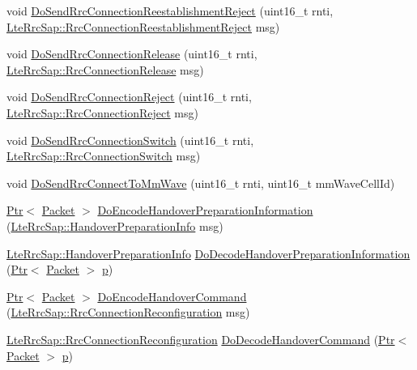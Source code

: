 \begin{DoxyCompactItemize}
\item 
void \hyperlink{classns3_1_1MmWaveEnbRrcProtocolIdeal_a5852803f45a6200cd609c0f5bae6fb29}{Do\+Send\+Rrc\+Connection\+Reestablishment\+Reject} (uint16\+\_\+t rnti, \hyperlink{structns3_1_1LteRrcSap_1_1RrcConnectionReestablishmentReject}{Lte\+Rrc\+Sap\+::\+Rrc\+Connection\+Reestablishment\+Reject} msg)
\item 
void \hyperlink{classns3_1_1MmWaveEnbRrcProtocolIdeal_a3a056c79c8f1e0b1ac5d64c544070df6}{Do\+Send\+Rrc\+Connection\+Release} (uint16\+\_\+t rnti, \hyperlink{structns3_1_1LteRrcSap_1_1RrcConnectionRelease}{Lte\+Rrc\+Sap\+::\+Rrc\+Connection\+Release} msg)
\item 
void \hyperlink{classns3_1_1MmWaveEnbRrcProtocolIdeal_aa56a53ba64c33ac87b57dabe8c31142f}{Do\+Send\+Rrc\+Connection\+Reject} (uint16\+\_\+t rnti, \hyperlink{structns3_1_1LteRrcSap_1_1RrcConnectionReject}{Lte\+Rrc\+Sap\+::\+Rrc\+Connection\+Reject} msg)
\item 
void \hyperlink{classns3_1_1MmWaveEnbRrcProtocolIdeal_a607eb31066bea3c99c0a8c201c2dc579}{Do\+Send\+Rrc\+Connection\+Switch} (uint16\+\_\+t rnti, \hyperlink{structns3_1_1LteRrcSap_1_1RrcConnectionSwitch}{Lte\+Rrc\+Sap\+::\+Rrc\+Connection\+Switch} msg)
\item 
void \hyperlink{classns3_1_1MmWaveEnbRrcProtocolIdeal_a2f404e7bc728fe77276e437e1f665759}{Do\+Send\+Rrc\+Connect\+To\+Mm\+Wave} (uint16\+\_\+t rnti, uint16\+\_\+t mm\+Wave\+Cell\+Id)
\item 
\hyperlink{classns3_1_1Ptr}{Ptr}$<$ \hyperlink{classns3_1_1Packet}{Packet} $>$ \hyperlink{classns3_1_1MmWaveEnbRrcProtocolIdeal_a0c1f97ed231f7e366eeccce429bf6ecb}{Do\+Encode\+Handover\+Preparation\+Information} (\hyperlink{structns3_1_1LteRrcSap_1_1HandoverPreparationInfo}{Lte\+Rrc\+Sap\+::\+Handover\+Preparation\+Info} msg)
\item 
\hyperlink{structns3_1_1LteRrcSap_1_1HandoverPreparationInfo}{Lte\+Rrc\+Sap\+::\+Handover\+Preparation\+Info} \hyperlink{classns3_1_1MmWaveEnbRrcProtocolIdeal_aebd78312da19b0fadf52e300020a1d81}{Do\+Decode\+Handover\+Preparation\+Information} (\hyperlink{classns3_1_1Ptr}{Ptr}$<$ \hyperlink{classns3_1_1Packet}{Packet} $>$ \hyperlink{lte__link__budget__x2__handover__measures_8m_ac9de518908a968428863f829398a4e62}{p})
\item 
\hyperlink{classns3_1_1Ptr}{Ptr}$<$ \hyperlink{classns3_1_1Packet}{Packet} $>$ \hyperlink{classns3_1_1MmWaveEnbRrcProtocolIdeal_a3fb294c2426f91653b1b9161ec4d73fc}{Do\+Encode\+Handover\+Command} (\hyperlink{structns3_1_1LteRrcSap_1_1RrcConnectionReconfiguration}{Lte\+Rrc\+Sap\+::\+Rrc\+Connection\+Reconfiguration} msg)
\item 
\hyperlink{structns3_1_1LteRrcSap_1_1RrcConnectionReconfiguration}{Lte\+Rrc\+Sap\+::\+Rrc\+Connection\+Reconfiguration} \hyperlink{classns3_1_1MmWaveEnbRrcProtocolIdeal_a8a8f0088fb00bd0e488894cd1cdf3358}{Do\+Decode\+Handover\+Command} (\hyperlink{classns3_1_1Ptr}{Ptr}$<$ \hyperlink{classns3_1_1Packet}{Packet} $>$ \hyperlink{lte__link__budget__x2__handover__measures_8m_ac9de518908a968428863f829398a4e62}{p})
\end{DoxyCompactItemize}
